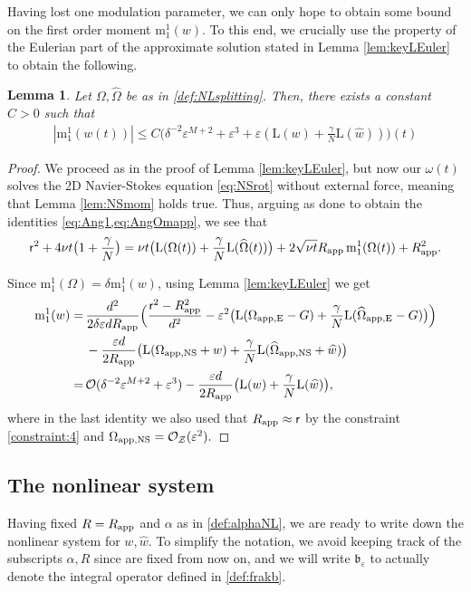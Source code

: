 \documentclass[11pt,reqno,a4paper]{amsart}
\def\eps{\varepsilon}
\newcommand{\cO}{\mathcal{O}}
\newcommand{\cZ}{\mathcal{Z}}
\newcommand{\mrm}{\mathrm{m}}
\newcommand{\1}{\mathbbm{1}}
\newtheorem{lemma}[proposition]{Lemma}
\theoremstyle{definition}
\theoremstyle{definition}
\numberwithin{equation}{section}
\begin{document}
Having lost one modulation parameter, we can only hope to obtain some bound on the first order moment $\mrm_1^1(w)$. To this end, we crucially use the property of the Eulerian part of the approximate solution stated in Lemma \ref{lem:keyLEuler} to obtain the following. 
\begin{lemma}
\label{lem:keymom}
    Let $\Omega,\widehat{\Omega}$ be as in \cref{def:NLsplitting}. Then, there exists a constant $C>0$ such that
\begin{align}
\label{bd:m11priori}
    |\mrm_1^1(w(t))|\leq C\big(\delta^{-2}\eps^{M+2}+\eps^3+\eps (\mathrm{L}( w)+\frac{\gamma}{N}\mathrm{L}( \widehat{w}))\big)(t)
\end{align}
\end{lemma}
\begin{proof}
We proceed as in the proof of Lemma \ref{lem:keyLEuler}, but now our $\omega(t)$ solves the 2D Navier-Stokes equation \cref{eq:NSrot} without external force, meaning that Lemma \ref{lem:NSmom} holds true. Thus, arguing as done to obtain the identities \cref{eq:Ang1,eq:AngOmapp}, we see that
\begin{align}
\label{eq:Ang2}
    \mathsf{r}^2+4\nu t\big(1+\frac{\gamma}{N}\big)=\nu t \big(\mathrm{L}(\Omega(t))+\frac{\gamma}{N}\mathrm{L}(\widehat{\Omega}(t))\big)+2\sqrt{\nu t}R_{\rm app}\, \mrm^1_1(\Omega(t))+R_{\rm app}^2.
\end{align}

Since $\mrm_1^1(\Omega)=\delta \mrm^1_1(w)$, using Lemma \ref{lem:keyLEuler} we  get
\begin{align}
\mrm_{1}^1(w)=\,&\frac{d^2}{2\delta \eps dR_{\rm app}}\Big(\frac{\mathsf{r}^2-R_{\rm app}^2}{d^2}-\eps^2\big(\mathrm{L}(\Omega_{\rm app,E}-G)+\frac{\gamma}{N}\mathrm{L}(\widehat{\Omega}_{\rm app,E}-G)\big)\Big)\\
    &-\frac{ \eps d}{2R_{\rm app}}\big(\mathrm{L}( \Omega_{\rm app,NS}+w)+\frac{\gamma}{N}\mathrm{L}( \widehat{\Omega}_{\rm app,NS}+\widehat{w})\big)\\
    =\,&\cO(\delta^{-2}\eps^{M+2}+\eps^3)-\frac{ \eps d}{2R_{\rm app}}\big(\mathrm{L}(w)+\frac{\gamma}{N}\mathrm{L}( \widehat{w})\big),
\end{align}
where in the last identity we also used that $R_{\rm app}\approx \mathsf{r}$ by the constraint \cref{constraint:4} and $\Omega_{\rm app,NS}=\cO_{\cZ}(\eps^2).$
\end{proof}

\subsection{The nonlinear system}
Having fixed $R=R_{\rm app}$ and $\alpha$ as in \cref{def:alphaNL}, we are ready to write down the nonlinear system for $w,\widehat{w}$. To simplify the notation, we avoid keeping track of the subscripts $\alpha,R$ since are fixed from now on, and we will write $\mathfrak{b}_\eps$ to actually denote the integral operator defined in \cref{def:frakb}. 
\end{document}
